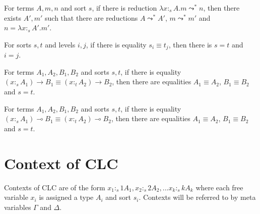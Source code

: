 \documentclass[sigplan,screen,review,anonymous]{acmart}
\newcommand{\stype}[1]{:_#1}
\newcommand{\red}{\leadsto^*}
\begin{document}
\begin{corollary}\label{redlaminv}
  For terms $A, m, n$ and sort $s$, if there is reduction $\lambda x \stype{s} A.m \red n$, then there exists $A',m'$ such that there are reductions $A \red A'$, $m \red m'$ and $n = \lambda x \stype{s} A'.m'$.
\end{corollary}

\begin{corollary}\label{sortinj}
  For sorts $s, t$ and levels $i, j$, if there is equality $s_i \equiv t_j$, then there is $s = t$ and $i = j$.
\end{corollary}

\begin{corollary}\label{arrowinj}
  For terms $A_1, A_2, B_1, B_2$ and sorts $s, t$, if there is equality $(x \stype{s} A_1) \rightarrow B_1 \equiv (x \stype{t} A_2) \rightarrow B_2$, then there are equalities $A_1 \equiv A_2$, $B_1 \equiv B_2$ and $s = t$.
\end{corollary}

\begin{corollary}\label{lolliinj}
  For terms $A_1, A_2, B_1, B_2$ and sorts $s, t$, if there is equality $(x \stype{s} A_1) \multimap B_1 \equiv (x \stype{t} A_2) \multimap B_2$, then there are equalities $A_1 \equiv A_2$, $B_1 \equiv B_2$ and $s = t$.
\end{corollary}

\section{Context of CLC}
Contexts of CLC are of the form $x_1 \stype{s1} A_1, x_2 \stype{s2} A_2, ... x_k \stype{sk} A_k$ where each free variable $x_i$ is assigned a type $A_i$ and sort $s_i$. Contexts will be referred to by meta variables $\Gamma$ and $\Delta$.
\end{document}
